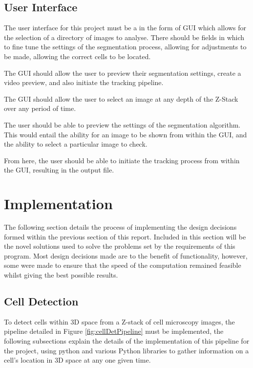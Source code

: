 \documentclass[12pt a4paper]{article}
\begin{document}
\subsection{User Interface}
The user interface for this project must be a in the form of  GUI which allows for the selection of a directory of images to analyse. There should be fields in which to fine tune the settings of the segmentation process, allowing for adjustments to be made, allowing the correct cells to be located.

The GUI should allow the user to preview their segmentation settings, create a video preview, and also initiate the tracking pipeline. 

The GUI should allow the user to select an image at any depth of the Z-Stack over any period of time.

The user should be able to preview the settings of the segmentation algorithm. This would entail the ability for an image to be shown from within the GUI, and the ability to select a particular image to check.

From here, the user should be able to initiate the tracking process from within the GUI, resulting in the output file.

\newpage

\section{Implementation}
The following section details the process of implementing the design decisions formed within the previous section of this report. Included in this section will be the novel solutions used to solve the problems set by the requirements of this program. Most design decisions made are to the benefit of functionality, however, some were made to ensure that the speed of the computation remained feasible whilst giving the best possible results. 
\subsection{Cell Detection}
To detect cells within 3D space from a Z-stack of cell microscopy images, the pipeline detailed in Figure \ref{fig:cellDetPipeline} must be implemented, the following subsections explain the details of the implementation of this pipeline for the project, using python and various Python libraries to gather information on a cell's location in 3D space at any one given time.
\end{document}
